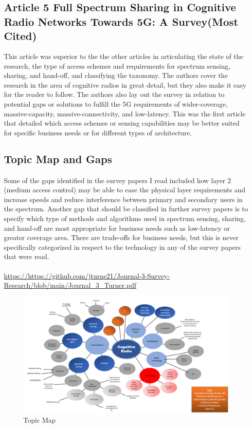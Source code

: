 \documentclass{article}
\begin{document}
\subsection{Article 5 Full Spectrum Sharing in Cognitive Radio Networks Towards 5G: A Survey(Most Cited)}\cite{5}
This article was superior to the the other articles in articulating the state of the research, the type of access schemes and requirements for spectrum sensing, sharing, and hand-off, and classifying the taxonomy.  The authors cover the research in the area of cognitive radios in great detail, but they also make it easy for the reader to follow.  The authors also lay out the survey in relation to potential gaps or solutions to fulfill the 5G requirements of  wider-coverage, massive-capacity, massive-connectivity, and low-latency\cite{5}.  This was the first article that detailed which access schemes or sensing capabilities may be better suited for specific business needs or for different types of architecture.
\subsection{Topic Map and Gaps}
\paragraph{}
Some of the gaps identified in the survey papers I read included how layer 2 (medium access control) may be able to ease the physical layer requirements and increase speeds and reduce interference between primary and secondary users in the spectrum. Another gap that should be classified in further survey papers is to specify which type of methods and algorithms used in spectrum sensing, sharing, and hand-off are most appropriate for business needs such as low-latency or greater coverage area.  There are trade-offs for business needs, but this is never specifically categorized in respect to the technology in any of the survey papers that were read.
\paragraph{}
\url{https://https://github.com/jturne21/Journal-3-Survey-Research/blob/main/Journal_3_Turner.pdf}
\begin{figure}
    \begin{center}
    \includegraphics[scale=.50]{TopicMap}
    \caption{Topic Map}
    \label{fig:Topic Map}
       \end{center}
\end{figure}

\newpage


\end{document}
